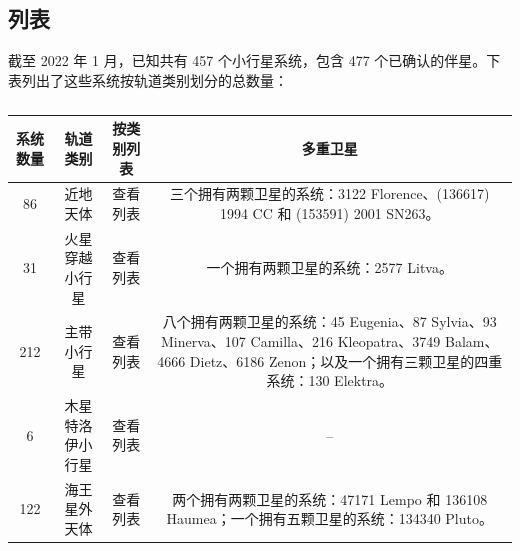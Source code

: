 \subsection{列表}
截至 2022 年 1 月，已知共有 457 个小行星系统，包含 477 个已确认的伴星。下表列出了这些系统按轨道类别划分的总数量：
\begin{table}[ht]
\centering
\caption{}\label{tab_Minor1}
\begin{tabular}{|c|c|c|c|}
\hline
\textbf{系统数量} & \textbf{轨道类别} & \textbf{按类别列表} & \textbf{多重卫星}\\
\hline
86 & 近地天体 & 查看列表 & 三个拥有两颗卫星的系统：3122 Florence、(136617) 1994 CC 和 (153591) 2001 SN263。\\
\hline
31 & 火星穿越小行星 & 查看列表 & 一个拥有两颗卫星的系统：2577 Litva。\\
\hline
212 & 主带小行星 & 查看列表 & 八个拥有两颗卫星的系统：45 Eugenia、87 Sylvia、93 Minerva、107 Camilla、216 Kleopatra、3749 Balam、4666 Dietz、6186 Zenon；以及一个拥有三颗卫星的四重系统：130 Elektra。\\
\hline
6 & 木星特洛伊小行星 & 查看列表 & –\\
\hline
122 & 海王星外天体 & 查看列表 & 两个拥有两颗卫星的系统：47171 Lempo 和 136108 Haumea；一个拥有五颗卫星的系统：134340 Pluto。\\
\hline
\end{tabular}
\end{table}
